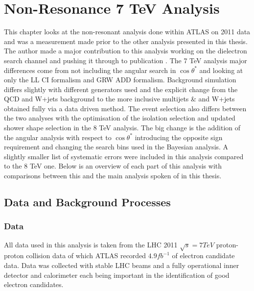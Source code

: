 \chapter{Non-Resonance 7 TeV Analysis}
\label{ch:7tev}

This chapter looks at the non-resonant analysis done within ATLAS on 2011 data and was a measurement made prior to the other analysis presented in this thesis. The author made a major contribution to this analysis working on the dielectron search channel and pushing it through to publication \cite{PhysRevD.87.015010}. 
The 7 TeV analysis major differences come from not including the angular search in $\cos{\theta^{*}}$ and looking at only the LL CI formalism and GRW ADD formalism. 
Background simulation differs slightly with different generators used and the explicit change from the QCD and W+jets background to the more inclusive multijets \& and W+jets obtained fully via a data driven method. The event selection also differs between the two analyses with the optimisation of the isolation selection and updated shower shape selection in the 8 TeV analysis. The big change is the addition of the angular analysis with respect to $\cos\theta^{*}$ introducing the opposite sign requirement and changing the search bins used in the Bayesian analysis. A slightly smaller list of systematic errors were included in this analysis compared to the 8 TeV one.
Below is an overview of each part of this analysis with comparisons between this and the main analysis spoken of in this thesis.






\section{Data and Background Processes}

\subsection*{Data}
	All data used in this analysis is taken from the LHC 2011 $\sqrt{s} = 7 TeV$ proton-proton collision data of which ATLAS recorded $4.9 fb^{-1}$ of electron candidate data. Data was collected with stable LHC beams and a fully operational inner detector and calorimeter each being important in the identification of good electron candidates.

